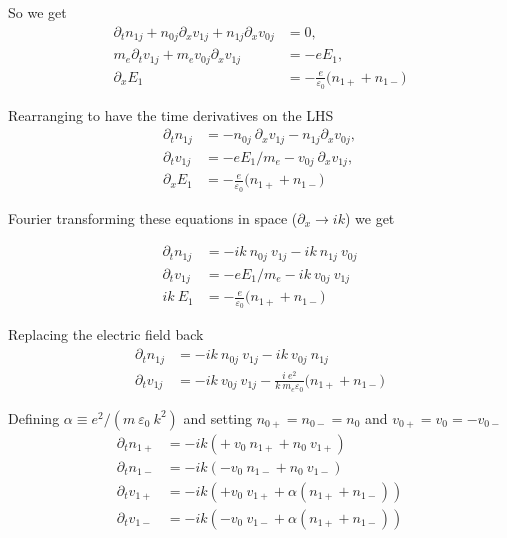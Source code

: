 So we get 
\begin{align}
    \partial_t n_{1j} + n_{0j} \partial_x v_{1j} + n_{1j} \partial_x v_{0j} &= 0, \label{eq:continuity}\\
    m_e \partial_t v_{1j} + m_e v_{0j} \partial_x v_{1j}  &= - e E_1, \label{eq:momentum}\\
    \partial_x E_1 &= -\frac{e}{\varepsilon_0}\bigl(n_{1+} + n_{1-} \bigr)\label{eq:poisson}
\end{align}

Rearranging to have the time derivatives on the LHS
\begin{align}
    \partial_t n_{1j} &= -n_{0j} ~\partial_x v_{1j} - n_{1j} \partial_x v_{0j}, \label{eq:continuity}\\
    \partial_t v_{1j} &= - e E_1/m_e - v_{0j} ~\partial_x v_{1j}, \label{eq:momentum}\\
    \partial_x E_1 &= -\frac{e}{\varepsilon_0}\bigl(n_{1+} + n_{1-} \bigr)\label{eq:poisson}
\end{align}


Fourier transforming these equations in space ($\partial_x \rightarrow ik$) we get

\begin{align}
\partial_t n_{1j} &= -i k ~n_{0j} ~v_{1j} -i k ~n_{1j} ~v_{0j}\\
%
\partial_t v_{1j} &= - e E_1/m_e - i k ~v_{0j}~ v_{1j}\\
%
ik~ E_1 &= -\frac{e}{\varepsilon_0}\bigl(n_{1+} + n_{1-} \bigr)
\end{align}

Replacing the electric field back
\begin{align}
\partial_t n_{1j} &= -i k ~n_{0j} ~v_{1j} - i k ~v_{0j}~n_{1j} \\
%
 \partial_t v_{1j}  &= - i k ~v_{0j}~ v_{1j} - \frac{i~e^2}{k ~m_e\varepsilon_0}\bigl(n_{1+} + n_{1-} \bigr)
\end{align}

Defining $\alpha \equiv e^2 /(m ~\varepsilon_0 ~k^2)$ and setting $n_{0+}=n_{0-}=n_0$ and $v_{0+}=v_0=-v_{0-}$
\begin{align}
\partial_t n_{1+} &= -i k (+~v_0~n_{1+} + n_{0} ~v_{1+} ) \\
%
\partial_t n_{1-} &= -i k (-v_0 ~n_{1-} + n_{0} ~v_{1-} ) \\
%
\partial_t v_{1+}  &= - i k \left( +v_0~ v_{1+} + \alpha \left(n_{1+} + n_{1-} \right) \right) \\
%
\partial_t v_{1-}  &= - i k \left( -v_0~ v_{1-} + \alpha \left(n_{1+} + n_{1-} \right) \right)
\end{align}

